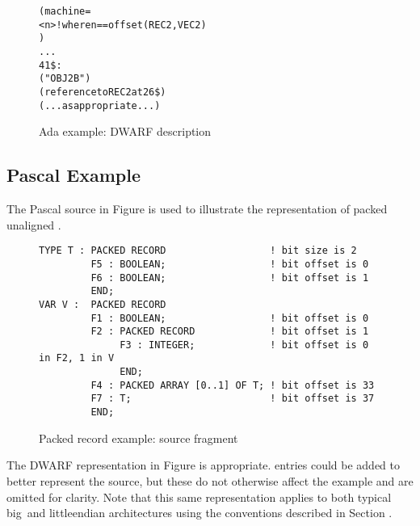 \begin{figure}[p]
\begin{dwflisting}
\begin{alltt}
            (machine=
                <n> ! where n == offset(REC2, VEC2)
                )
     . . .
41\$: 
        ("OBJ2B")
        (reference to REC2 at 26\$)
        (...as appropriate...)
\end{alltt}
\end{dwflisting}
\caption{Ada example: DWARF description}
\label{fig:adaexampledwarfdescription}
\end{figure}

\clearpage

\subsection{Pascal Example}
\label{app:pascalexample}
The Pascal  source in 
Figure 
is used to illustrate the representation of packed unaligned
.

\begin{figure}[here]
\begin{lstlisting}
TYPE T : PACKED RECORD                  ! bit size is 2
         F5 : BOOLEAN;                  ! bit offset is 0
         F6 : BOOLEAN;                  ! bit offset is 1
         END;
VAR V :  PACKED RECORD
         F1 : BOOLEAN;                  ! bit offset is 0
         F2 : PACKED RECORD             ! bit offset is 1
              F3 : INTEGER;             ! bit offset is 0 in F2, 1 in V
              END;
         F4 : PACKED ARRAY [0..1] OF T; ! bit offset is 33
         F7 : T;                        ! bit offset is 37
         END;
\end{lstlisting}
\caption{Packed record example: source fragment}
\label{fig:packedrecordexamplesourcefragment}
\end{figure}

The DWARF representation in 
Figure  
is appropriate. 
 entries could be added to
better represent the source, but these do not otherwise affect
the example and are omitted for clarity. Note that this same
representation applies to both typical big\dash \ and 
little\dash endian
architectures using the conventions described in 
Section .

